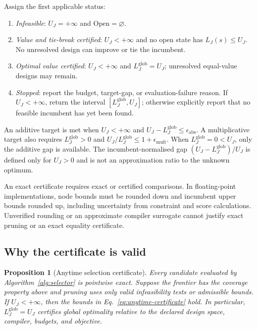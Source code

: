 \documentclass[a4paper,onecolumn,11pt,unpublished]{quantumarticle}
\newtheorem{proposition}[proposition]{Proposition}
\theoremstyle{remark}
\begin{document}
Assign the first applicable status:
\begin{enumerate}
\item \emph{Infeasible}: $U_J=+\infty$ and $\mathrm{Open}=\varnothing$.
\item \emph{Value and tie-break certified}: $U_J<+\infty$ and no open state
has $L_J(s)\leq U_J$.  No unresolved design can improve or tie the incumbent.
\item \emph{Optimal value certified}: $U_J<+\infty$ and
$L_J^{\mathrm{glob}}=U_J$; unresolved equal-value designs may remain.
\item \begin{minipage}[t]{\linewidth}\emph{Stopped}: report the budget, target-gap, or evaluation-failure
reason.  If $U_J<+\infty$, return the interval
$[L_J^{\mathrm{glob}},U_J]$; otherwise explicitly report that no feasible
incumbent has yet been found.\end{minipage}
\end{enumerate}
An additive target is met when $U_J<+\infty$ and
$U_J-L_J^{\mathrm{glob}}\leq\epsilon_{\mathrm{abs}}$.
A multiplicative target also requires $L_J^{\mathrm{glob}}>0$ and
$U_J/L_J^{\mathrm{glob}}\leq1+\epsilon_{\mathrm{mult}}$.
When $L_J^{\mathrm{glob}}=0<U_J$, only the additive gap is available.
The incumbent-normalised gap $(U_J-L_J^{\mathrm{glob}})/U_J$ is defined only
for $U_J>0$ and is not an approximation ratio to the unknown optimum.

An exact certificate requires exact or certified comparisons.  In floating-point
implementations, node bounds must be rounded down and incumbent upper bounds
rounded up, including uncertainty from constraint and score calculations.
Unverified rounding or an approximate compiler surrogate cannot justify
exact pruning or an exact equality certificate.

\subsection{Why the certificate is valid}
\label{app:anytime-certificate-proof}

\begin{proposition}[Anytime selection certificate]
\label{prop:anytime-certificate}
Every candidate evaluated by Algorithm~\ref{alg:selector} is pointwise exact.
Suppose the frontier has the coverage property above and pruning uses only
valid infeasibility tests or admissible bounds.  If \(U_J<+\infty\), then
the bounds in Eq.~\eqref{eq:anytime-certificate} hold.
In particular, \(L_J^{\mathrm{glob}}=U_J\) certifies global optimality
relative to the declared design space, compiler, budgets, and objective.
\end{proposition}
\end{document}
